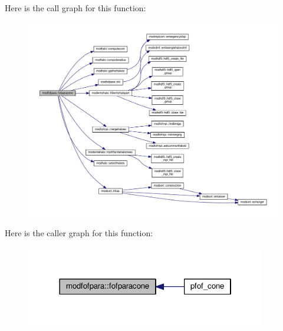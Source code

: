 Here is the call graph for this function\-:\nopagebreak
\begin{figure}[H]
\begin{center}
\leavevmode
\includegraphics[width=350pt]{classmodfofpara_a033a2820dd29f107782b566ca298bde4_cgraph}
\end{center}
\end{figure}




Here is the caller graph for this function\-:\nopagebreak
\begin{figure}[H]
\begin{center}
\leavevmode
\includegraphics[width=298pt]{classmodfofpara_a033a2820dd29f107782b566ca298bde4_icgraph}
\end{center}
\end{figure}


